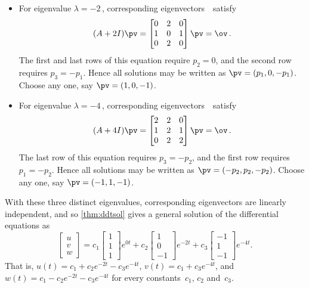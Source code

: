 \begin{example}
\begin{solution}
\begin{itemize}
\item For eigenvalue \(\lambda=-2\)\,, corresponding eigenvectors~\pv\ satisfy
\begin{equation*}
(A+2I)\pv=\begin{bmatrix} 0&2&0\\1&0&1\\0&2&0 \end{bmatrix}\pv=\ov\,.
\end{equation*}
The first and last rows of this equation require \(p_2=0\), and the second row requires \(p_3=-p_1\).
Hence all solutions may be written as \(\pv=(p_1,0,-p_1)\).
Choose any one, say \(\pv=(1,0,-1)\).

\item For eigenvalue \(\lambda=-4\)\,, corresponding eigenvectors~\pv\ satisfy
\begin{equation*}
(A+4I)\pv=\begin{bmatrix} 2&2&0\\1&2&1\\0&2&2 \end{bmatrix}\pv=\ov\,.
\end{equation*}
The last row of this equation requires \(p_3=-p_2\), and the first row requires \(p_1=-p_2\).
Hence all solutions may be written as \(\pv=(-p_2,p_2,-p_2)\).
Choose any one, say \(\pv=(-1,1,-1)\).

\end{itemize}
With these three distinct eigenvalues, corresponding eigenvectors are linearly independent, and so \autoref{thm:ddtsol} gives a general solution of the differential equations as
\begin{equation*}
\begin{bmatrix} u\\v\\w \end{bmatrix}
=c_1\begin{bmatrix} 1\\1\\1 \end{bmatrix}e^{0t}
+c_2\begin{bmatrix} 1\\0\\-1 \end{bmatrix}e^{-2t}
+c_3\begin{bmatrix} -1\\1\\-1 \end{bmatrix}e^{-4t}.
\end{equation*}
That is, \(u(t)=c_1+c_2e^{-2t}-c_3e^{-4t}\), \(v(t)=c_1+c_3e^{-4t}\), and \(w(t)=c_1-c_2e^{-2t}-c_3e^{-4t}\) for every constants~\(c_1\), \(c_2\) and~\(c_3\).
\end{solution}
\end{example}





